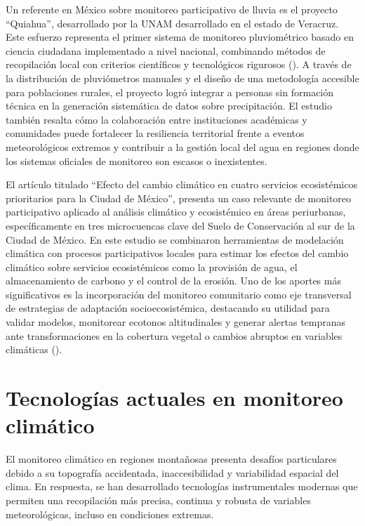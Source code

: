Un referente en México sobre monitoreo participativo de lluvia es el proyecto ``Quiahua'', desarrollado por la UNAM desarrollado en el estado de Veracruz. Este esfuerzo representa el primer sistema de monitoreo pluviométrico basado en ciencia ciudadana implementado a nivel nacional, combinando métodos de recopilación local con criterios científicos y tecnológicos rigurosos (\cite{quiahua2022}). A través de la distribución de pluviómetros manuales y el diseño de una metodología accesible para poblaciones rurales, el proyecto logró integrar a personas sin formación técnica en la generación sistemática de datos sobre precipitación. El estudio también resalta cómo la colaboración entre instituciones académicas y comunidades puede fortalecer la resiliencia territorial frente a eventos meteorológicos extremos y contribuir a la gestión local del agua en regiones donde los sistemas oficiales de monitoreo son escasos o inexistentes.


El artículo titulado ``Efecto del cambio climático en cuatro servicios ecosistémicos prioritarios para la Ciudad de México'', presenta un caso relevante de monitoreo participativo aplicado al análisis climático y ecosistémico en áreas periurbanas, específicamente en tres microcuencas clave del Suelo de Conservación al sur de la Ciudad de México. En este estudio se combinaron herramientas de modelación climática con procesos participativos locales para estimar los efectos del cambio climático sobre servicios ecosistémicos como la provisión de agua, el almacenamiento de carbono y el control de la erosión. Uno de los aportes más significativos es la incorporación del monitoreo comunitario como eje transversal de estrategias de adaptación socioecosistémica, destacando su utilidad para validar modelos, monitorear ecotonos altitudinales y generar alertas tempranas ante transformaciones en la cobertura vegetal o cambios abruptos en variables climáticas (\cite{dratere2021}).




\section{Tecnologías actuales en monitoreo climático}
El monitoreo climático en regiones montañosas presenta desafíos particulares debido a su topografía accidentada, inaccesibilidad y variabilidad espacial del clima. En respuesta, se han desarrollado tecnologías instrumentales modernas que permiten una recopilación más precisa, continua y robusta de variables meteorológicas, incluso en condiciones extremas.

